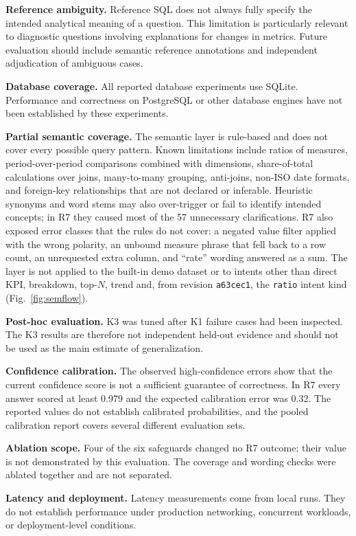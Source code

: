 \documentclass[conference]{IEEEtran}
\begin{document}
\textbf{Reference ambiguity.} Reference SQL does not always fully specify the intended analytical meaning of a question. This limitation is particularly relevant to diagnostic questions involving explanations for changes in metrics. Future evaluation should include semantic reference annotations and independent adjudication of ambiguous cases.

\textbf{Database coverage.} All reported database experiments use SQLite. Performance and correctness on PostgreSQL or other database engines have not been established by these experiments.

\textbf{Partial semantic coverage.} The semantic layer is rule-based and does not cover every possible query pattern. Known limitations include ratios of measures, period-over-period comparisons combined with dimensions, share-of-total calculations over joins, many-to-many grouping, anti-joins, non-ISO date formats, and foreign-key relationships that are not declared or inferable. Heuristic synonyms and word stems may also over-trigger or fail to identify intended concepts; in R7 they caused most of the 57 unnecessary clarifications. R7 also exposed error classes that the rules do not cover: a negated value filter applied with the wrong polarity, an unbound measure phrase that fell back to a row count, an unrequested extra column, and ``rate'' wording answered as a sum. The layer is not applied to the built-in demo dataset or to intents other than direct KPI, breakdown, top-$N$, trend and, from revision \texttt{a63cec1}, the \texttt{ratio} intent kind (Fig.~\ref{fig:semflow}).

\textbf{Post-hoc evaluation.} K3 was tuned after K1 failure cases had been inspected. The K3 results are therefore not independent held-out evidence and should not be used as the main estimate of generalization.

\textbf{Confidence calibration.} The observed high-confidence errors show that the current confidence score is not a sufficient guarantee of correctness. In R7 every answer scored at least 0.979 and the expected calibration error was 0.32. The reported values do not establish calibrated probabilities, and the pooled calibration report covers several different evaluation sets.

\textbf{Ablation scope.} Four of the six safeguards changed no R7 outcome; their value is not demonstrated by this evaluation. The coverage and wording checks were ablated together and are not separated.

\textbf{Latency and deployment.} Latency measurements come from local runs. They do not establish performance under production networking, concurrent workloads, or deployment-level conditions.
\end{document}
